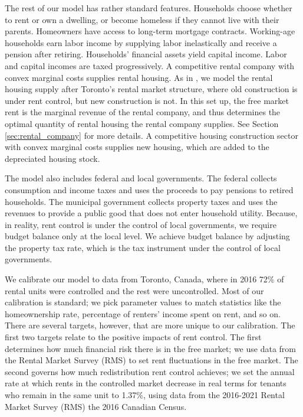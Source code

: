 \documentclass[parskip=full]{article}
\begin{document}
The rest of our model has rather standard features. Households choose whether to rent or own a dwelling, or become homeless if they cannot live with their parents. Homeowners have access to long-term mortgage contracts. Working-age households earn labor income by supplying labor inelastically and receive a pension after retiring. Households' financial assets yield capital income. Labor and capital incomes are taxed progressively. A competitive rental company with convex marginal costs supplies rental housing. As in \citet{fallis-1985}, we model the rental housing supply after Toronto's rental market structure, where old construction is under rent control, but new construction is not. In this set up, the free market rent is the marginal revenue of the rental company, and thus determines the optimal quantity of rental housing the rental company supplies. See Section \ref{sec:rental_company} for more details. A competitive housing construction sector with convex marginal costs supplies new housing, which are added to the depreciated housing stock. 

The model also includes federal and local governments. The federal collects consumption and income taxes and uses the proceeds to pay pensions to retired households. The municipal government collects property taxes and uses the revenues to provide a public good that does not enter household utility. Because, in reality, rent control is under the control of local governments, we require budget balance only at the local level. We achieve budget balance by adjusting the property tax rate, which is the tax instrument under the control of local governments.

We calibrate our model to data from Toronto, Canada, where in 2016 72\% of rental units were controlled and the rest were uncontrolled. Most of our calibration is standard; we pick parameter values to match statistics like the homeownership rate, percentage of renters' income spent on rent, and so on. There are several targets, however, that are more unique to our calibration. The first two targets relate to the positive impacts of rent control. The first determines how much financial risk there is in the free market; we use data from the Rental Market Survey (RMS) to set rent fluctuations in the free market. The second governs how much redistribution rent control achieves; we set the annual rate at which rents in the controlled market decrease in real terms for tenants who remain in the same unit to 1.37\%, using data from the 2016-2021 Rental Market Survey (RMS) the 2016 Canadian Census. 
\end{document}
